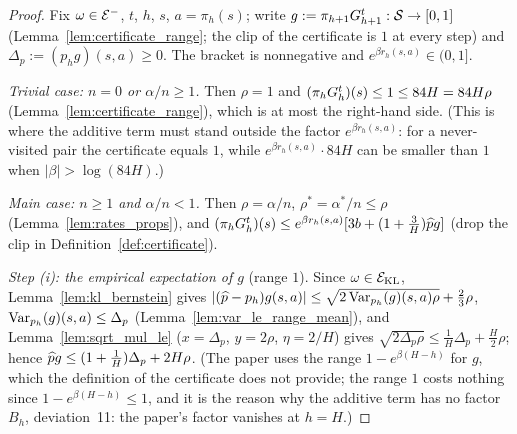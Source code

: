 \begin{proof}
\leanok
Fix $\omega \in \mathcal{E}^-$, $t$, $h$, $s$, $a = \pi_h(s)$; write $g := \pi_{h+1}G^t_{h+1} : \mathcal{S} \to [0, 1]$
(Lemma~\ref{lem:certificate_range}; the clip of the certificate is $1$ at every step) and
$\Delta_p := (p_hg)(s,a) \ge 0$. The bracket is nonnegative and $e^{\beta r_h(s,a)} \in (0, 1]$.

\emph{Trivial case: $n = 0$ or $\alpha/n \ge 1$.} Then $\rho = 1$ and
$(\pi_hG_h^t)(s) \le 1 \le 84H = 84H\rho$ (Lemma~\ref{lem:certificate_range}), which is at most the
right-hand side. (This is where the additive term must stand outside the factor $e^{\beta r_h(s,a)}$:
for a never-visited pair the certificate equals $1$, while $e^{\beta r_h(s,a)}\cdot 84H$ can be smaller
than $1$ when $|\beta| > \log(84H)$.)

\emph{Main case: $n \ge 1$ and $\alpha/n < 1$.} Then $\rho = \alpha/n$, $\rho^* = \alpha^*/n \le \rho$
(Lemma~\ref{lem:rates_props}), and $(\pi_hG_h^t)(s) \le e^{\beta r_h(s,a)}[3b + (1 + \frac3H)\widehat{p} g]$
(drop the clip in Definition~\ref{def:certificate}).

\emph{Step (i): the empirical expectation of $g$} (range $1$). Since $\omega \in \mathcal{E}_{\mathrm{KL}}$,
Lemma~\ref{lem:kl_bernstein} gives $\lvert (\widehat{p} - p_h)g(s,a) \rvert \le \sqrt{2\operatorname{Var}_{p_h}(g)(s,a)\rho} + \frac23\rho$,
$\operatorname{Var}_{p_h}(g)(s,a) \le \Delta_p$ (Lemma~\ref{lem:var_le_range_mean}), and Lemma~\ref{lem:sqrt_mul_le}
($x = \Delta_p$, $y = 2\rho$, $\eta = 2/H$) gives $\sqrt{2\Delta_p\rho} \le \frac1H\Delta_p + \frac H2\rho$; hence
$\widehat{p} g \le (1 + \frac1H)\Delta_p + 2H\rho$. (The paper uses the range $1 - e^{\beta(H-h)}$ for $g$, which
the definition of the certificate does not provide; the range $1$ costs nothing since
$1 - e^{\beta(H-h)} \le 1$, and it is the reason why the additive term has no factor $B_h$,
deviation~11: the paper's factor vanishes at $h = H$.)


\end{proof}
